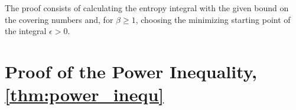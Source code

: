 The proof consists of calculating the entropy integral with the given bound on the covering numbers and, for $\beta \geq 1$, choosing the minimizing starting point of the integral $\epsilon>0$.
%
%
%
%
%
%
%
\section{Proof of the Power Inequality, \autoref{thm:power_inequ}}\label{app:power_inequality}
%

%
